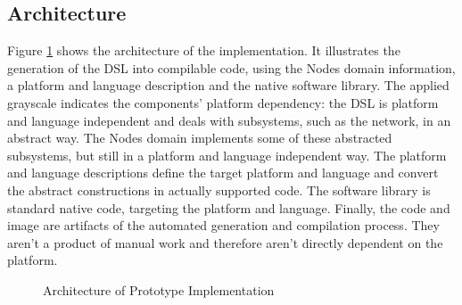 \documentclass[conference]{IEEEtran}
\begin{document}
\subsection{Architecture}

Figure \ref{fig:architecture} shows the architecture of the implementation. It
illustrates the generation of the DSL into compilable code, using the Nodes
domain information, a platform and language description and the native software
library. The applied grayscale indicates the components' platform dependency:
the DSL is platform and language independent and deals with subsystems, such as
the network, in an abstract way. The Nodes domain implements some of these
abstracted subsystems, but still in a platform and language independent way.
The platform and language descriptions define the target platform and language
and convert the abstract constructions in actually supported code. The software
library is standard native code, targeting the platform and language. Finally,
the code and image are artifacts of the automated generation and compilation
process. They aren't a product of manual work and therefore aren't directly
dependent on the platform.

\begin{figure}[ht]
  \centering
  \caption{Architecture of Prototype Implementation}
  \label{fig:architecture}
\end{figure}
\end{document}
